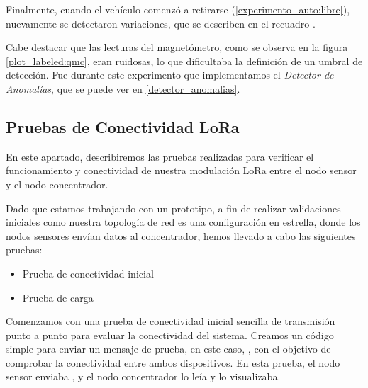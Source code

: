 Finalmente, cuando el vehículo comenzó a retirarse (\ref{experimento_auto:libre}), nuevamente se detectaron variaciones, que se describen en el recuadro .

Cabe destacar que las lecturas del magnetómetro, como se observa en la figura \ref{plot_labeled:qmc}, eran ruidosas, lo que dificultaba la definición de un umbral de detección. Fue durante este experimento que implementamos el \textit{Detector de Anomalías}, que se puede ver en \ref{detector_anomalias}.


\subsection{Pruebas de Conectividad LoRa}\label{title:cx_load_concentrador}

En este apartado, describiremos las pruebas realizadas para verificar el funcionamiento y conectividad de nuestra modulación LoRa entre el nodo sensor y el nodo concentrador.

Dado que estamos trabajando con un prototipo, a fin de realizar validaciones iniciales como nuestra topología de red es una configuración en estrella, donde los nodos sensores envían datos al concentrador, hemos llevado a cabo las siguientes pruebas:

\begin{itemize}
    \item Prueba de conectividad inicial
    \item Prueba de carga
\end{itemize}

Comenzamos con una prueba de conectividad inicial sencilla de transmisión punto a punto para evaluar la conectividad del sistema. Creamos un código simple para enviar un mensaje de prueba, en este caso, , con el objetivo de comprobar la conectividad entre ambos dispositivos. En esta prueba, el nodo sensor enviaba , y el nodo concentrador lo leía y lo visualizaba.

